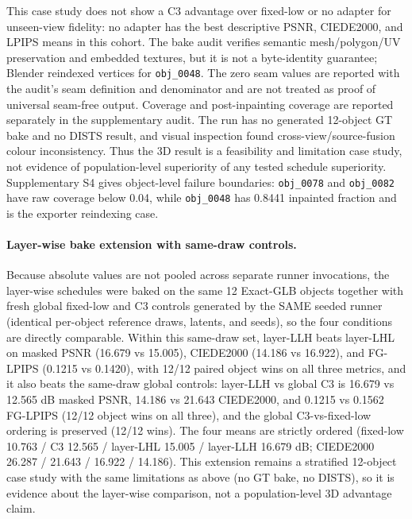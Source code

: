 \documentclass[times,twocolumn,final]{elsarticle}
\begin{document}
This case study does not show a C3 advantage over fixed-low or no adapter for
unseen-view fidelity: no adapter has the best descriptive PSNR, CIEDE2000, and
LPIPS means in this cohort. The bake audit verifies semantic mesh/polygon/UV
preservation and embedded textures, but it is not a byte-identity guarantee;
Blender reindexed vertices for \texttt{obj\_0048}. The zero seam values are
reported with the audit's seam definition and denominator and are not treated
as proof of universal seam-free output. Coverage and post-inpainting coverage
are reported separately in the supplementary audit. The run has no generated
12-object GT bake and no DISTS result, and visual inspection found
cross-view/source-fusion colour inconsistency. Thus the 3D result is a
feasibility and limitation case study, not evidence of population-level superiority of any tested schedule
superiority. Supplementary S4 gives object-level failure boundaries:
\texttt{obj\_0078} and \texttt{obj\_0082} have raw coverage below 0.04, while
\texttt{obj\_0048} has 0.8441 inpainted fraction and is the exporter
reindexing case.

\paragraph{Layer-wise bake extension with same-draw controls.}
Because absolute values are not pooled across separate runner invocations,
the layer-wise schedules were baked on the same 12 Exact-GLB objects
together with fresh global fixed-low and C3 controls generated by the SAME
seeded runner (identical per-object reference draws, latents, and seeds), so
the four conditions are directly comparable. Within this same-draw set,
layer-LLH beats layer-LHL on masked PSNR (16.679 vs 15.005), CIEDE2000
(14.186 vs 16.922), and FG-LPIPS (0.1215 vs 0.1420), with 12/12 paired
object wins on all three metrics, and it also beats the same-draw global
controls: layer-LLH vs global C3 is 16.679 vs 12.565 dB masked PSNR, 14.186
vs 21.643 CIEDE2000, and 0.1215 vs 0.1562 FG-LPIPS (12/12 object wins on all
three), and the global C3-vs-fixed-low ordering is preserved (12/12 wins).
The four means are strictly ordered (fixed-low 10.763 / C3 12.565 /
layer-LHL 15.005 / layer-LLH 16.679 dB; CIEDE2000 26.287 / 21.643 / 16.922 /
14.186). This extension remains a
stratified 12-object case study with the same limitations as above (no GT
bake, no DISTS), so it is evidence about the layer-wise comparison, not a
population-level 3D advantage claim.
\end{document}
